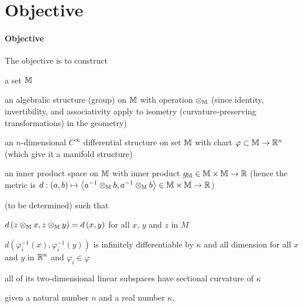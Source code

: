 \documentclass[stu, babel, american, biblatex, a4paper, draftall]{apa7}
\begin{document}
\section{Objective}
\paragraph{Objective}\label{Objective}
The objective is to construct
\begin{APAenumerate}
    \item a set $\mathbb{M}$
    \item an algebralic structure (group) on $\mathbb{M}$ with operation $\otimes_{\mathbb{M}}$ (since identity, invertibility, and associativity apply to isometry (curvature-preserving transformations) in the geometry)
    \item an $n$-dimensional $C^\infty$ differential structure on set $\mathbb{M}$ with chart $\varphi\subset \mathbb{M}\to\mathbb{R}^n$ (which give it a manifold structure)
    \item an inner product space on $\mathbb{M}$ with inner product $g_{\mathbb{M}}\in\mathbb{M}\times\mathbb{M}\to\mathbb{R}$ (hence the metric is $d:\left(a,b\right)\mapsto\left\langle{a^{-1}\otimes_{\mathbb{M}}b},{a^{-1}\otimes_{\mathbb{M}}b}\right\rangle\in\mathbb{M}\times\mathbb{M}\to\mathbb{R}$)
\end{APAenumerate}
(to be determined)
such that
\begin{APAitemize}
    \item $d\left(z\otimes_{\mathbb{M}}x,z\otimes_{\mathbb{M}}y\right) = d\left(x,y\right)$ for all $x$, $y$ and $z$ in $M$
    \item $d\left(\varphi_i^{-1}\left(x\right), \varphi_i^{-1}\left(y\right)\right)$ is infinitely differentiable by $\kappa$ and all dimension for all $x$ and $y$ in $\mathbb{R}^n$ and $\varphi_i\in\varphi$
    \item all of its two-dimensional linear subspaces have sectional curvature of $\kappa$
\end{APAitemize}
given a natural number $n$ and a real number $\kappa$.
\end{document}
